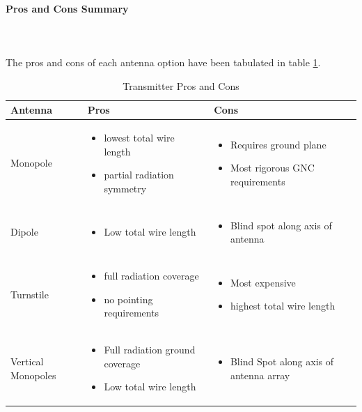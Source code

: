 \paragraph{Pros and Cons Summary}~\\ ~\\
The pros and cons of each antenna option have been tabulated in table \ref{tbl:antenna_procon}.
\begin{table}[H]
\centering
\begin{tabular}{|p{}|p{}|p{}|} 
\hline
\textbf{Antenna} & \textbf{Pros} & \textbf{Cons}
\\
\hline
     Monopole
     &
    \begin{itemize}
        \item lowest total wire length
        \item partial radiation symmetry
    \end{itemize}
    &
    \begin{itemize}
        \item Requires ground plane
        \item Most rigorous GNC requirements
    \end{itemize}
    \\
\hline
     Dipole
     &
    \begin{itemize}
        \item Low total wire length
    \end{itemize}
    &
        \begin{itemize}
        \item Blind spot along axis of antenna
    \end{itemize}
    \\
\hline
    Turnstile
    &
    \begin{itemize}
        \item full radiation coverage
        \item no pointing requirements
    \end{itemize}
    &
    \begin{itemize}
        \item Most expensive
        \item highest total wire length
    \end{itemize}
    \\
    \hline
    Vertical Monopoles
    &
    \begin{itemize}
        \item Full radiation ground coverage
        \item Low total wire length 
    \end{itemize}
    &
    \begin{itemize}
        \item Blind Spot along axis of antenna array
    \end{itemize}
    \\
\hline
\end{tabular}
\caption{Transmitter Pros and Cons \cite{isis_ground}}
\label{tbl:antenna_procon}
\end{table}
